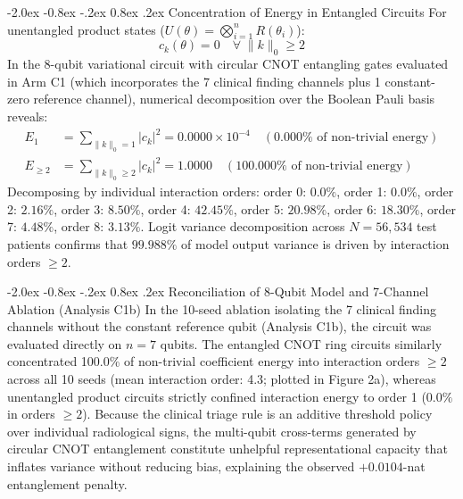 \documentclass[10pt,a4paper]{article}
\makeatletter
\renewcommand{\subsection}{\@startsection{subsection}{2}{\z@}%
  {-2.0ex \@plus -0.8ex \@minus -.2ex}%
  {0.8ex \@plus.2ex}%
  {\normalfont\large\sffamily\bfseries\color{naturedark}}}
\makeatother
\begin{document}
\subsection{Concentration of Energy in Entangled Circuits}
For unentangled product states ($U(\theta) = \bigotimes_{i=1}^n R(\theta_i)$):
\begin{equation}
c_k(\theta) = 0 \quad \forall \; \lVert k \rVert_0 \ge 2
\end{equation}
In the 8-qubit variational circuit with circular CNOT entangling gates evaluated in Arm C1 (which incorporates the 7 clinical finding channels plus 1 constant-zero reference channel), numerical decomposition over the Boolean Pauli basis reveals:
\begin{align}
E_1 &= \sum_{\lVert k \rVert_0 = 1} |c_k|^2 = 0.0000 \times 10^{-4} \quad (0.000\% \text{ of non-trivial energy}) \\
E_{\ge 2} &= \sum_{\lVert k \rVert_0 \ge 2} |c_k|^2 = 1.0000 \quad (100.000\% \text{ of non-trivial energy})
\end{align}
Decomposing by individual interaction orders: order 0: $0.0\%$, order 1: $0.0\%$, order 2: $2.16\%$, order 3: $8.50\%$, order 4: $42.45\%$, order 5: $20.98\%$, order 6: $18.30\%$, order 7: $4.48\%$, order 8: $3.13\%$. Logit variance decomposition across $N = 56,534$ test patients confirms that $99.988\%$ of model output variance is driven by interaction orders $\ge 2$. 

\subsection{Reconciliation of 8-Qubit Model and 7-Channel Ablation (Analysis C1b)}
In the 10-seed ablation isolating the 7 clinical finding channels without the constant reference qubit (Analysis C1b), the circuit was evaluated directly on $n=7$ qubits. The entangled CNOT ring circuits similarly concentrated 100.0\% of non-trivial coefficient energy into interaction orders $\ge 2$ across all 10 seeds (mean interaction order: 4.3; plotted in Figure 2a), whereas unentangled product circuits strictly confined interaction energy to order 1 ($0.0\%$ in orders $\ge 2$). Because the clinical triage rule is an additive threshold policy over individual radiological signs, the multi-qubit cross-terms generated by circular CNOT entanglement constitute unhelpful representational capacity that inflates variance without reducing bias, explaining the observed $+0.0104$-nat entanglement penalty.

\newpage
\end{document}
